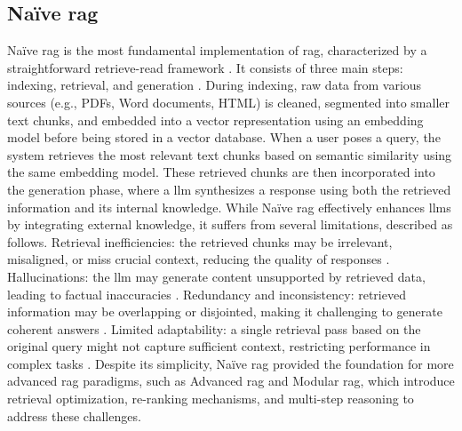 \subsection*{Na\"ive \gls{rag}}\label{sec:naive-rag}
Na\"ive \gls{rag} is the most fundamental implementation of \gls{rag}, characterized by a straightforward retrieve-read framework \cite{gao_retrieval-augmented_2024}.
It consists of three main steps: indexing, retrieval, and generation \cite{gao_retrieval-augmented_2024,singh2025}.
During indexing, raw data from various sources (e.g., PDFs, Word documents, HTML) is cleaned, segmented into smaller text chunks, and embedded into a vector representation using an embedding model before being stored in a vector database.
When a user poses a query, the system retrieves the most relevant text chunks based on semantic similarity using the same embedding model.
These retrieved chunks are then incorporated into the generation phase, where a \gls{llm} synthesizes a response using both the retrieved information and its internal knowledge.
While Na\"ive \gls{rag} effectively enhances \glspl{llm} by integrating external knowledge, it suffers from several limitations, described as follows.
Retrieval inefficiencies: the retrieved chunks may be irrelevant, misaligned, or miss crucial context, reducing the quality of responses \cite{gao_retrieval-augmented_2024,singh2025}.
Hallucinations: the \gls{llm} may generate content unsupported by retrieved data, leading to factual inaccuracies \cite{gao_retrieval-augmented_2024}.
Redundancy and inconsistency: retrieved information may be overlapping or disjointed, making it challenging to generate coherent answers \cite{gao_retrieval-augmented_2024}.
Limited adaptability: a single retrieval pass based on the original query might not capture sufficient context, restricting performance in complex tasks \cite{gao_retrieval-augmented_2024,singh2025}.
Despite its simplicity, Na\"ive \gls{rag} provided the foundation for more advanced \gls{rag} paradigms, such as Advanced \gls{rag} and Modular \gls{rag}, which introduce retrieval optimization, re-ranking mechanisms, and multi-step reasoning to address these challenges.

